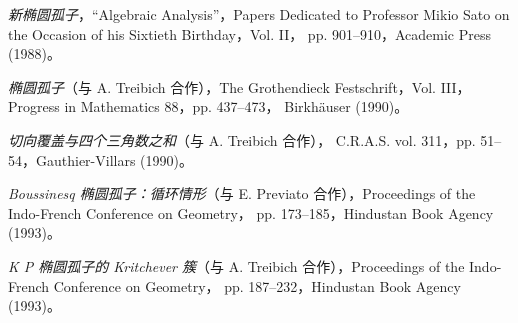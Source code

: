 \clearpage
{}
\small
\begin{description}
\item[{[50]}] \emph{新椭圆孤子}，``Algebraic Analysis''，Papers Dedicated
to Professor Mikio Sato on the Occasion of his Sixtieth Birthday，Vol. II，
pp. 901--910，Academic Press (1988)。

\item[{[51]}] \emph{椭圆孤子}（与 A. Treibich 合作），The Grothendieck
Festschrift，Vol. III，Progress in Mathematics 88，pp. 437--473，
Birkhäuser (1990)。

\item[{[52]}] \emph{切向覆盖与四个三角数之和}（与 A. Treibich 合作），
C.R.A.S. vol. 311，pp. 51--54，Gauthier-Villars (1990)。

\item[{[53]}] \emph{Boussinesq 椭圆孤子：循环情形}（与 E. Previato
合作），Proceedings of the Indo-French Conference on Geometry，
pp. 173--185，Hindustan Book Agency (1993)。

\item[{[54]}] \emph{K P 椭圆孤子的 Kritchever 簇}（与 A. Treibich
合作），Proceedings of the Indo-French Conference on Geometry，
pp. 187--232，Hindustan Book Agency (1993)。
\end{description}
\normalsize
